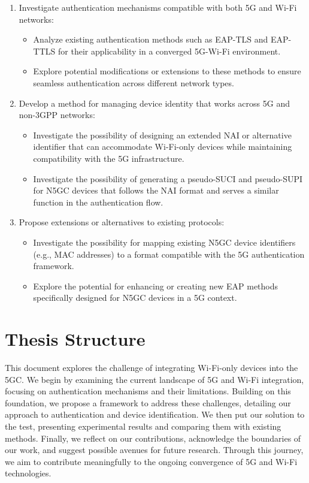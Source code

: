 \begin{enumerate}
    \item{
        Investigate authentication mechanisms compatible with both \ac{5G} and Wi-Fi networks:
        \begin{itemize}
            \item Analyze existing authentication methods such as \ac{EAP-TLS} and \ac{EAP-TTLS} for their applicability in a converged \ac{5G}-Wi-Fi environment.
            \item Explore potential modifications or extensions to these methods to ensure seamless authentication across different network types.
        \end{itemize}
    }
    \item{
        Develop a method for managing device identity that works across \ac{5G} and non-\ac{3GPP} networks:
        \begin{itemize}
            \item Investigate the possibility of designing an extended \ac{NAI} or alternative identifier that can accommodate Wi-Fi-only devices while maintaining compatibility with the \ac{5G} infrastructure.
            \item Investigate the possibility of generating a pseudo-\ac{SUCI} and pseudo-\ac{SUPI} for \ac{N5GC} devices that follows the \ac{NAI} format and serves a similar function in the authentication flow.
        \end{itemize}
    }
    \item{
        Propose extensions or alternatives to existing protocols:
        \begin{itemize}
            \item Investigate the possibility for mapping existing \ac{N5GC} device identifiers (e.g., \ac{MAC} addresses) to a format compatible with the \ac{5G} authentication framework.
            \item Explore the potential for enhancing or creating new \ac{EAP} methods specifically designed for \ac{N5GC} devices in a \ac{5G} context.
        \end{itemize}
    }
\end{enumerate}

\section{Thesis Structure}

This document explores the challenge of integrating Wi-Fi-only devices into the \ac{5GC}. We begin by examining the current landscape of \ac{5G} and Wi-Fi integration, focusing on authentication mechanisms and their limitations. Building on this foundation, we propose a framework to address these challenges, detailing our approach to authentication and device identification. We then put our solution to the test, presenting experimental results and comparing them with existing methods. Finally, we reflect on our contributions, acknowledge the boundaries of our work, and suggest possible avenues for future research. Through this journey, we aim to contribute meaningfully to the ongoing convergence of \ac{5G} and Wi-Fi technologies.
